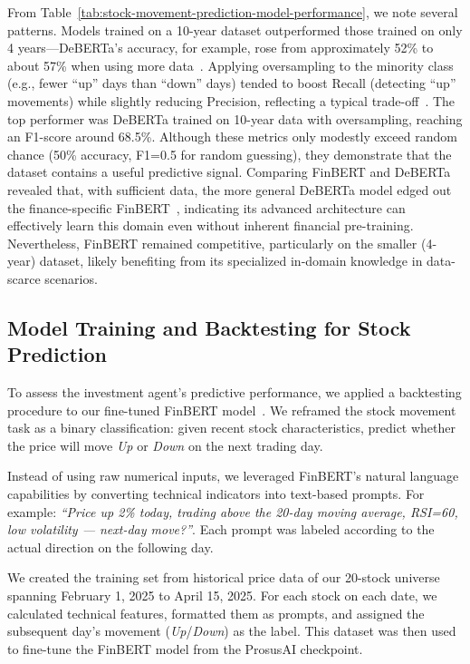 \documentclass[conference]{IEEEtran}
\begin{document}
From Table~\ref{tab:stock-movement-prediction-model-performance}, we note several patterns. Models trained on a 10-year dataset outperformed those trained on only 4 years—DeBERTa’s accuracy, for example, rose from approximately 52\% to about 57\% when using more data~\cite{brown2020}. Applying oversampling to the minority class (e.g., fewer “up” days than “down” days) tended to boost Recall (detecting “up” movements) while slightly reducing Precision, reflecting a typical trade-off~\cite{deepfinance2021}. The top performer was DeBERTa trained on 10-year data with oversampling, reaching an F1-score around 68.5\%. Although these metrics only modestly exceed random chance (50\% accuracy, F1=0.5 for random guessing), they demonstrate that the dataset contains a useful predictive signal. Comparing FinBERT and DeBERTa revealed that, with sufficient data, the more general DeBERTa model edged out the finance-specific FinBERT~\cite{finbert2020}, indicating its advanced architecture can effectively learn this domain even without inherent financial pre-training. Nevertheless, FinBERT remained competitive, particularly on the smaller (4-year) dataset, likely benefiting from its specialized in-domain knowledge in data-scarce scenarios.

\subsection{Model Training and Backtesting for Stock Prediction}

To assess the investment agent’s predictive performance, we applied a backtesting procedure to our fine-tuned FinBERT model~\cite{finbert2020}. We reframed the stock movement task as a binary classification: given recent stock characteristics, predict whether the price will move \emph{Up} or \emph{Down} on the next trading day.

Instead of using raw numerical inputs, we leveraged FinBERT’s natural language capabilities by converting technical indicators into text-based prompts. For example: \textit{“Price up 2\% today, trading above the 20-day moving average, RSI=60, low volatility — next-day move?”}. Each prompt was labeled according to the actual direction on the following day.

We created the training set from historical price data of our 20-stock universe spanning February 1, 2025 to April 15, 2025. For each stock on each date, we calculated technical features, formatted them as prompts, and assigned the subsequent day’s movement (\emph{Up}/\emph{Down}) as the label. This dataset was then used to fine-tune the FinBERT model from the ProsusAI checkpoint.
\end{document}
